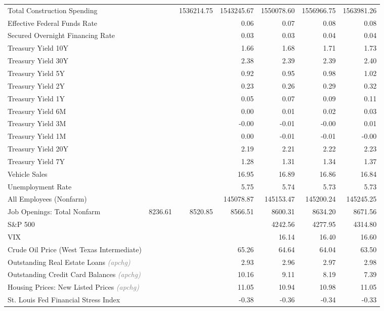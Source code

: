 \documentclass[11pt, letterpaper]{article}\usepackage[]{graphicx}\usepackage[]{color}
\begin{document}
\begin{table}[H]
\begin{tabular}{lrrrrrr}
  Total Construction Spending &  & 1536214.75 & 1543245.67 & 1550078.60 & 1556966.75 & 1563981.26 \\ 
  Effective Federal Funds Rate &  &  & 0.06 & 0.07 & 0.08 & 0.08 \\ 
  Secured Overnight Financing Rate &  &  & 0.03 & 0.03 & 0.04 & 0.04 \\ 
  Treasury Yield 10Y &  &  & 1.66 & 1.68 & 1.71 & 1.73 \\ 
  Treasury Yield 30Y &  &  & 2.38 & 2.39 & 2.39 & 2.40 \\ 
  Treasury Yield 5Y &  &  & 0.92 & 0.95 & 0.98 & 1.02 \\ 
  Treasury Yield 2Y &  &  & 0.23 & 0.26 & 0.29 & 0.32 \\ 
  Treasury Yield 1Y &  &  & 0.05 & 0.07 & 0.09 & 0.11 \\ 
  Treasury Yield 6M &  &  & 0.00 & 0.01 & 0.02 & 0.03 \\ 
  Treasury Yield 3M &  &  & -0.00 & -0.01 & -0.00 & 0.01 \\ 
  Treasury Yield 1M &  &  & 0.00 & -0.01 & -0.01 & -0.00 \\ 
  Treasury Yield 20Y &  &  & 2.19 & 2.21 & 2.22 & 2.23 \\ 
  Treasury Yield 7Y &  &  & 1.28 & 1.31 & 1.34 & 1.37 \\ 
  Vehicle Sales &  &  & 16.95 & 16.89 & 16.86 & 16.84 \\ 
  Unemployment Rate &  &  & 5.75 & 5.74 & 5.73 & 5.73 \\ 
  All Employees (Nonfarm) &  &  & 145078.87 & 145153.47 & 145200.24 & 145245.25 \\ 
  Job Openings: Total Nonfarm & 8236.61 & 8520.85 & 8566.51 & 8600.31 & 8634.20 & 8671.56 \\ 
  S\&P 500 &  &  &  & 4242.56 & 4277.95 & 4314.80 \\ 
  VIX &  &  &  & 16.14 & 16.40 & 16.60 \\ 
  Crude Oil Price (West Texas Intermediate) &  &  & 65.26 & 64.64 & 64.04 & 63.50 \\ 
  Outstanding Real Estate Loans \textit{\footnotesize\textcolor{gray}{(apchg)}} &  &  & 2.93 & 2.96 & 2.97 & 2.98 \\ 
  Outstanding Credit Card Balances \textit{\footnotesize\textcolor{gray}{(apchg)}} &  &  & 10.16 & 9.11 & 8.19 & 7.39 \\ 
  Housing Prices: New Listed Prices \textit{\footnotesize\textcolor{gray}{(apchg)}} &  &  & 11.05 & 10.94 & 10.98 & 11.05 \\ 
  St. Louis Fed Financial Stress Index &  &  & -0.38 & -0.36 & -0.34 & -0.33 \\ 

\end{tabular}
\end{table}
\end{document}
